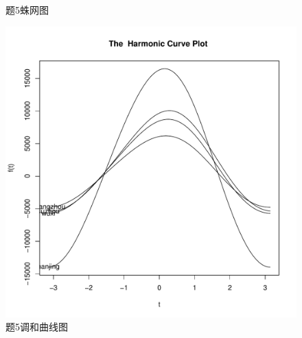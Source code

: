 \begin{enumerate}
\begin{figure}[H]
            \caption{题5蛛网图}
        \end{figure}
        \begin{figure}[H]
          \centering
            \includegraphics[scale=0.4]{3-5调和曲线图.pdf}
            \caption{题5调和曲线图}
        \end{figure}
    \end{enumerate}
\clearpage
